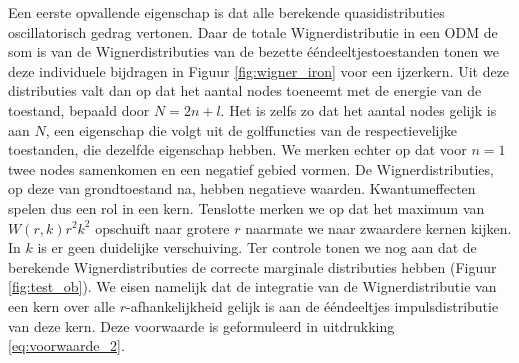 \documentclass[11pt,twoside]{book}
\begin{document}
Een eerste opvallende eigenschap is dat alle berekende quasidistributies oscillatorisch gedrag vertonen. Daar de totale Wignerdistributie in een ODM de som is van de Wignerdistributies van de bezette \'{e}\'{e}ndeeltjestoestanden tonen we deze individuele bijdragen in Figuur \ref{fig:wigner_iron} voor een ijzerkern. Uit deze distributies valt dan op dat het aantal nodes toeneemt met de energie van de toestand, bepaald door $N=2n+l$. Het is zelfs zo dat het aantal nodes gelijk is aan $N$, een eigenschap die volgt uit de golffuncties van de respectievelijke toestanden, die dezelfde eigenschap hebben. We merken echter op dat voor $n=1$ twee nodes samenkomen en een negatief gebied vormen.
De Wignerdistributies, op deze van grondtoestand na, hebben negatieve waarden. Kwantumeffecten spelen dus een rol in een kern.
Tenslotte merken we op dat het maximum van $W(r,k)r^2 k^2$ opschuift naar grotere $r$ naarmate we naar zwaardere kernen kijken. In $k$ is er geen duidelijke verschuiving. 
Ter controle tonen we nog aan dat de berekende Wignerdistributies de correcte marginale distributies hebben (Figuur \ref{fig:test_ob}). We eisen namelijk dat de integratie van de  Wignerdistributie van een kern over alle $r$-afhankelijkheid gelijk is aan de \'{e}\'{e}ndeeltjes impulsdistributie van deze kern. Deze voorwaarde is geformuleerd in uitdrukking \eqref{eq:voorwaarde_2}.
\end{document}
